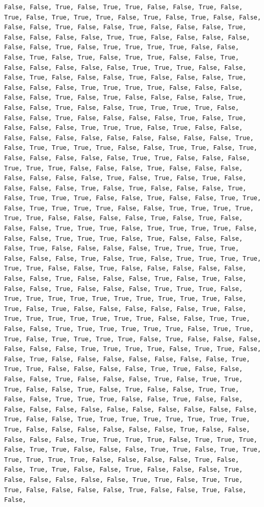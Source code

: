 \documentclass[
  letterpaper,
  DIV=11,
  numbers=noendperiod]{scrartcl}
\begin{document}
\begin{verbatim}
False, False, True, False, True, True, False, False, True, False, True, False, True, True, True, False, True, False, True, False, False, False, False, True, False, False, True, False, False, False, True, False, False, False, False, True, True, False, False, False, False, False, False, True, False, True, True, True, True, False, False, False, True, False, True, False, True, True, False, False, True, False, False, False, False, False, True, True, True, False, False, False, True, False, False, False, True, False, False, False, True, False, False, False, True, True, True, True, False, False, False, False, False, True, False, True, False, False, False, False, True, False, False, True, False, False, True, True, True, True, False, False, False, True, False, False, False, False, True, False, True, False, False, False, True, True, True, False, True, False, False, False, False, False, False, False, False, False, False, False, True, False, True, True, True, True, False, False, True, True, False, True, False, False, False, False, False, True, True, False, False, False, True, True, True, False, False, False, True, False, False, False, False, False, False, False, True, False, True, False, True, False, False, False, False, True, False, True, False, False, False, True, False, True, True, True, False, False, True, False, False, True, True, False, True, True, True, True, False, False, True, True, True, True, True, True, False, False, False, False, True, False, True, False, False, False, True, True, True, False, True, True, True, True, False, False, False, True, True, True, False, True, False, False, False, False, True, False, False, False, False, True, True, True, True, False, False, False, True, False, True, False, True, True, True, True, True, True, False, False, True, False, False, False, False, False, False, False, True, False, False, False, True, False, True, False, False, False, True, False, False, False, True, True, True, False, True, True, True, True, True, True, True, True, True, True, False, True, False, True, False, False, False, False, False, True, False, True, True, True, True, True, True, True, False, False, True, True, False, False, True, True, True, True, True, True, False, True, True, True, False, True, True, True, True, False, True, False, False, False, False, False, False, True, True, True, True, False, True, True, False, False, True, False, False, False, False, False, False, False, True, True, True, False, False, False, False, True, True, False, False, False, False, True, False, False, False, True, False, True, True, True, False, False, True, False, True, False, False, True, True, False, False, True, True, True, False, False, True, False, False, False, False, False, False, False, False, False, False, False, False, True, False, False, True, True, True, True, True, True, True, True, True, False, False, False, False, False, False, True, False, False, False, False, False, True, True, True, True, False, True, True, True, False, True, True, False, False, False, True, True, False, True, True, True, True, True, True, False, False, False, False, True, False, False, True, True, False, False, True, False, False, False, True, False, False, False, False, False, True, True, False, True, True, True, False, False, False, False, True, False, False, True, False, False, 
\end{verbatim}
\end{document}
